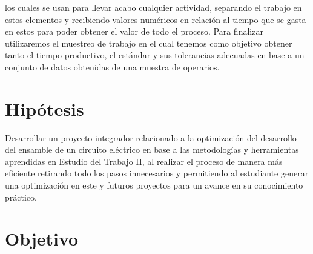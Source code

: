         los cuales se usan para llevar acabo cualquier actividad, separando el trabajo en estos elementos y recibiendo valores numéricos en relación al tiempo que se gasta en estos para poder obtener el valor de todo el proceso. Para finalizar utilizaremos el muestreo de trabajo en el cual tenemos como objetivo obtener tanto el tiempo productivo, el estándar y sus tolerancias adecuadas en base a un conjunto de datos obtenidas de una muestra de operarios.
        \cite{EstTrabajo}
     
    \section{Hipótesis}
    

    Desarrollar un proyecto integrador relacionado a la optimización del desarrollo del ensamble de un circuito eléctrico en base a las metodologías y herramientas aprendidas en Estudio del Trabajo II, al realizar el proceso de manera más eficiente retirando todo los pasos innecesarios y permitiendo al estudiante generar una optimización en este y futuros proyectos para un avance en su conocimiento práctico.
    
    
    \section{Objetivo}
    
